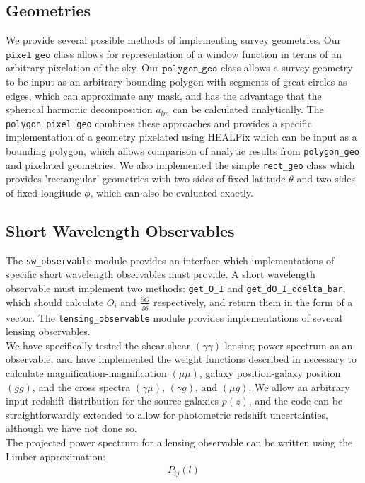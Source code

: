 \documentclass[a4paper,11pt]{article}
\begin{document}
\subsection{Geometries}
\label{ssec:geometries}
We provide several possible methods of implementing survey geometries. Our $\texttt{pixel\_geo}$ class allows for representation of a window function in terms of an arbitrary pixelation of the sky. Our $\texttt{polygon\_geo}$ class allows a survey geometry to be input as an arbitrary bounding polygon with segments of great circles as edges, which can approximate any mask, and has the advantage that the spherical harmonic decomposition $a_{l m}$ can be calculated analytically. The \texttt{polygon\_pixel\_geo} combines these approaches and provides a specific implementation of a geometry pixelated using HEALPix\cite{HEALPix} which can be input as a bounding polygon, which allows comparison of analytic results from \texttt{polygon\_geo} and pixelated geometries. We also implemented the simple \texttt{rect\_geo} class which provides 'rectangular' geometries with two sides of fixed latitude $\theta$ and two sides of fixed longitude $\phi$, which can also be evaluated exactly. 

\subsection{Short Wavelength Observables}
\label{ssec:sw_observables}
The \texttt{sw\_observable} module provides an interface which implementations of specific short wavelength observables must provide. A short wavelength observable must implement two methods: \texttt{get\_O\_I}  and \texttt{get\_dO\_I\_ddelta\_bar}, which should calculate $O_i$ and $\frac{\partial O}{\partial \bar{\delta}}$ respectively, and return them in the form of a vector. The \texttt{lensing\_observable} module provides implementations of several lensing observables. 
\\
We have specifically tested the shear-shear $(\gamma\gamma)$ lensing power spectrum as an observable, and have implemented the weight functions described in \cite{eifler_krause_cosmolike} necessary to calculate magnification-magnification $(\mu\mu)$, galaxy position-galaxy position $(gg)$, and the cross spectra $(\gamma\mu)$, $(\gamma g)$, and $(\mu g)$. We allow an arbitrary input redshift distribution for the source galaxies $p(z)$, and the code can be straightforwardly extended to allow for photometric redshift uncertainties, although we have not done so. 
\\
The projected power spectrum for a lensing observable can be written using the Limber approximation:
\begin{align}\label{limber_power}
P_{ij}(l)
\end{align}
\end{document}
